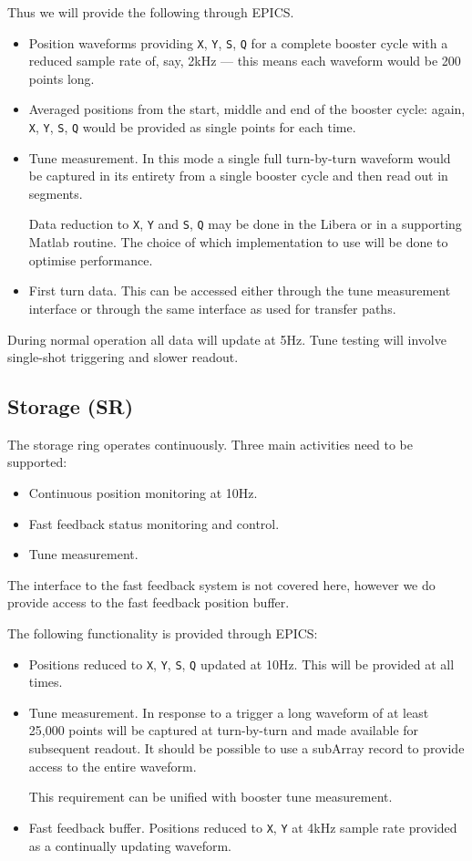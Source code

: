 \documentclass[
    a4paper,
    fleqn
]{article}
\newcommand{\id}[1]{\texttt{#1}}
\newcommand{\XY}{\id{X}, \id{Y}}
\newcommand{\SQ}{\id{S}, \id{Q}}
\newcommand{\XYSQ}{\XY, \SQ}
\begin{document}
Thus we will provide the following through EPICS.
\begin{itemize}
\item
  Position waveforms providing \XYSQ{} for a complete booster cycle
  with a reduced sample rate of, say, 2kHz --- this means each
  waveform would be 200 points long.
\item
  Averaged positions from the start, middle and end of the booster
  cycle: again, \XYSQ{} would be provided as single points for each
  time. 
\item
  Tune measurement.  In this mode a single full turn-by-turn waveform
  would be captured in its entirety from a single booster cycle and
  then read out in segments.

  Data reduction to \XY{} and \SQ{} may be done in the Libera or in a
  supporting Matlab routine.  The choice of which implementation to
  use will be done to optimise performance.
\item
  First turn data.  This can be accessed either through the tune
  measurement interface or through the same interface as used for
  transfer paths.
\end{itemize}

During normal operation all data will update at 5Hz.  Tune testing
will involve single-shot triggering and slower readout.


\subsection{Storage (SR)}

The storage ring operates continuously.  Three main activities need to
be supported:
\begin{itemize}
\item
  Continuous position monitoring at 10Hz.
\item
  Fast feedback status monitoring and control.
\item
  Tune measurement.
\end{itemize}
The interface to the fast feedback system is not covered here, however
we do provide access to the fast feedback position buffer.

The following functionality is provided through EPICS:
\begin{itemize}
\item
  Positions reduced to \XYSQ{} updated at 10Hz.  This will be provided
  at all times.
\item
  Tune measurement.  In response to a trigger a long waveform of at
  least 25,000 points will be captured at turn-by-turn and made
  available for subsequent readout.  It should be possible to use a
  subArray record to provide access to the entire waveform.  

  This requirement can be unified with booster tune measurement.
\item
  Fast feedback buffer.  Positions reduced to \XY{} at 4kHz sample
  rate provided as a continually updating waveform.
\end{itemize}
\end{document}
